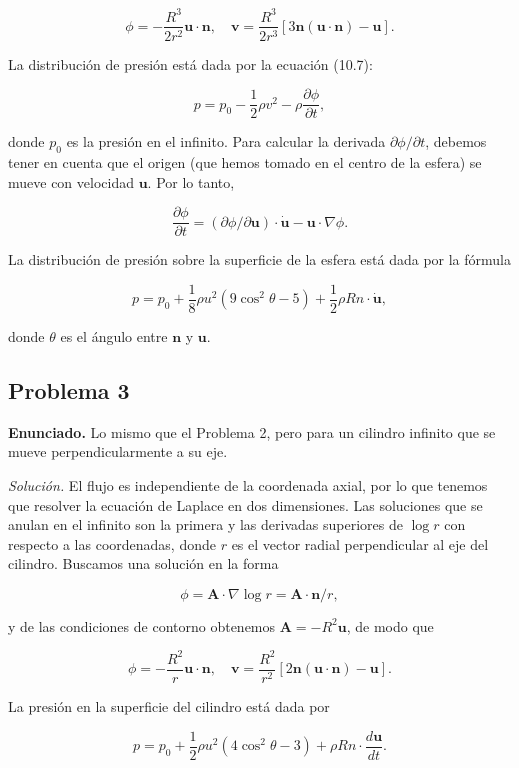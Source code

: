\documentclass{article}
\begin{document}
$$
\phi = -\frac{R^3}{2r^2} \mathbf{u} \cdot \mathbf{n}, \quad \mathbf{v} = \frac{R^3}{2r^3} [3\mathbf{n}(\mathbf{u} \cdot \mathbf{n}) - \mathbf{u}].
$$

La distribución de presión está dada por la ecuación (10.7):

$$
p = p_0 - \frac{1}{2} \rho v^2 - \rho \frac{\partial \phi}{\partial t},
$$

donde $p_0$ es la presión en el infinito. Para calcular la derivada $\partial \phi/\partial t$, debemos tener en cuenta que el origen (que hemos tomado en el centro de la esfera) se mueve con velocidad $\mathbf{u}$. Por lo tanto,

$$
\frac{\partial \phi}{\partial t} = (\partial \phi/\partial \mathbf{u}) \cdot \dot{\mathbf{u}} - \mathbf{u} \cdot \nabla \phi.
$$

La distribución de presión sobre la superficie de la esfera está dada por la fórmula

$$
p = p_0 + \frac{1}{8} \rho u^2 (9 \cos^2 \theta - 5) + \frac{1}{2} \rho R n \cdot \dot{\mathbf{u}},
$$

donde $\theta$ es el ángulo entre $\mathbf{n}$ y $\mathbf{u}$.

\subsection*{Problema 3}

\textbf{Enunciado.} Lo mismo que el Problema 2, pero para un cilindro infinito que se mueve perpendicularmente a su eje.

\textit{Solución.} El flujo es independiente de la coordenada axial, por lo que tenemos que resolver la ecuación de Laplace en dos dimensiones. Las soluciones que se anulan en el infinito son la primera y las derivadas superiores de $\log r$ con respecto a las coordenadas, donde $r$ es el vector radial perpendicular al eje del cilindro. Buscamos una solución en la forma

$$
\phi = \mathbf{A} \cdot \nabla \log r = \mathbf{A} \cdot \mathbf{n}/r,
$$

y de las condiciones de contorno obtenemos $\mathbf{A} = -R^2 \mathbf{u}$, de modo que

$$
\phi = -\frac{R^2}{r} \mathbf{u} \cdot \mathbf{n}, \quad \mathbf{v} = \frac{R^2}{r^2} [2\mathbf{n}(\mathbf{u} \cdot \mathbf{n}) - \mathbf{u}].
$$

La presión en la superficie del cilindro está dada por

$$
p = p_0 + \frac{1}{2} \rho u^2 (4 \cos^2 \theta - 3) + \rho R n \cdot \frac{d\mathbf{u}}{dt}.
$$
\end{document}

